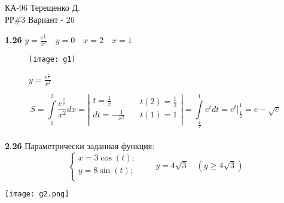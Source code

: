 \documentclass[14pt,a4paper]{scrartcl}
\theoremstyle{definition}
\theoremstyle{remark}
\theoremstyle{definition}
\theoremstyle{definition}
\begin{document}
\begin{center}
  КА-96 Терещенко Д.\\
  РР\#3 Вариант - 26
\end{center}
\textbf{1.26}
$y = \displaystyle\frac{e^{  \frac{1}{x} }}{x^2} \quad y=0 \quad x=2 \quad x=1$\\
\begin{figure}[h]
\centering\texttt{[image: g1]}
\caption{$y = \displaystyle\frac{e^{  \frac{1}{x} }}{x^2}$}
\end{figure}
$$ S = \int\limits_{1}^{2}{\frac{e^{  \frac{1}{x} }}{x^2}}dx = \left| \begin{gathered}
 t = \frac{1}{x}\\
 dt = - \frac{1}{x^2}\\
\end{gathered} \quad \begin{gathered}
 t(2) = \frac{1}{2}  \\
 t(1) = 1\\
\end{gathered} \right|  =
 \int\limits_{ \frac{1}{2} }^{ 1}{e^tdt} =
 e^t \Big|^{1}_{\frac{1}{2}} = e - \sqrt{e}
$$
\pagebreak\\
\textbf{2.26} Параметрически заданная функция:\\
$$\left\lbrace \begin{gathered}
x = 3 \cos{(t)};\\
y = 8 \sin{(t)};\\
\end{gathered}
\right.
\qquad y = 4 \sqrt{3} \quad (y\geq 4\sqrt{3})
$$
\begin{center}
\texttt{[image: g2.png]}
\end{center}
\end{document}

